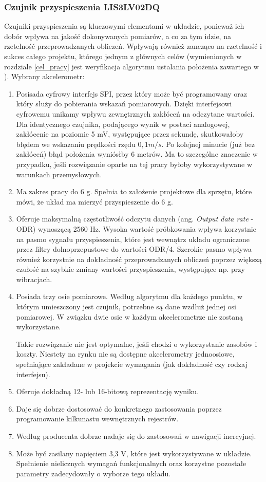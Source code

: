 \subsubsection{Czujnik przyspieszenia LIS3LV02DQ}
Czujniki przyspieszenia są kluczowymi elementami w układzie, ponieważ ich dobór wpływa na jakość dokonywanych pomiarów, a co za tym idzie, na rzetelność przeprowadzanych obliczeń. Wpływają również zancząco na rzetelność i sukces całego projektu, którego jednym z głównych celów (wymienionych w rozdziale \ref{cel_pracy} jest weryfikacja algorytmu ustalania położenia zawartego w \cite{Tan00}).
Wybrany akcelerometr:
\begin{enumerate}
	\item Posisada cyfrowy interfejs SPI, przez który może być programowany oraz który służy do pobierania wskazań pomiarowych. Dzięki interfejsowi cyfrowemu unikamy wpływu zewnętrznych zakłóceń na odczytane wartości. Dla identycznego czujnika, podającego wynik w postaci analogowej, zakłócenie na poziomie 5 mV, występujące przez sekundę, skutkowałoby błędem we wskazaniu prędkości rzędu $0,1 m/s$. Po kolejnej minucie (już bez zakłóceń) błąd położenia wyniósłby 6 metrów. Ma to szczególne znaczenie w przypadku, jeśli rozwiązanie oparte na tej pracy byłoby wykorzystywane w warunkach przemysłowych.
	\item Ma zakres pracy do 6 g. Spełnia to założenie projektowe dla sprzętu, które mówi, że układ ma mierzyć przyspieszenie do 6 g.
	\item Oferuje maksymalną częstotliwość odczytu danych (ang. \textit{Output data rate} - ODR) wynoszącą 2560 Hz. Wysoka wartość próbkowania wpływa korzystnie na pasmo sygnału przyspieszenia, które jest wewnątrz układu ograniczone przez filtry dolnoprzepustowe do wartości ODR/4. Szerokie pasmo wpływa również korzystnie na dokładność przeprowadzanych obliczeń poprzez większą czułość na szybkie zmiany wartości przyspieszenia, występujące np. przy wibracjach.
	\item Posiada trzy osie pomiarowe. Według algorytmu dla każdego punktu, w którym umieszczony jest czujnik, potrzebne są dane wzdłuż jednej osi pomiarowej. W związku dwie osie w każdym akcelerometrze nie zostaną wykorzystane.

Takie rozwiązanie nie jest optymalne, jeśli chodzi o wykorzystanie zasobów i koszty. Niestety na rynku nie są dostępne akcelerometry jednoosiowe, spełniające zakładane w projekcie wymagania (jak dokładność czy rodzaj interfejsu).
	\item Oferuje dokładną 12- lub 16-bitową reprezentację wyniku.
	\item Daje się dobrze dostosować do konkretnego zastosowania poprzez programowanie kilkunastu wewnętrznych rejestrów.
	\item Według producenta dobrze nadaje się do zastosowań w nawigacji inercyjnej.
	\item Może być zasilany napięciem 3,3 V, które jest wykorzystywane w układzie.
Spełnienie nielicznych wymagań funkcjonalnych oraz korzystne pozostałe parametry zadecydowały o wyborze tego układu.
\end{enumerate}

